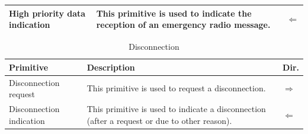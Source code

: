 \documentclass[nocc]{template/openetcs_report}
\begin{document}
\begin{longtable}{|l|l|l|}
				\hline	
													
				\begin{minipage}[t]{0.3\linewidth}High priority data indication \end{minipage}
					&\begin{minipage}[t]{0.6\linewidth} This primitive is used to indicate the reception of an emergency radio message.	\end{minipage}
					&\begin{minipage}[t]{0.1\linewidth} $\Leftarrow$ \end{minipage} \\
				
				\hline										
			\end{longtable}		
					
					
			\begin{longtable}{|l|l|l|}
				\caption{Disconnection}\\ 
				\hline
				
					\begin{minipage}[t]{0.3\linewidth} \textbf{Primitive}	\end{minipage}
				&	\begin{minipage}[t]{0.6\linewidth} \textbf{Description}	\end{minipage}
				&	\begin{minipage}[t]{0.1\linewidth} \textbf{Dir.} \end{minipage} \\
				
				\hline
				
					\begin{minipage}[t]{0.3\linewidth}Disconnection request \end{minipage}
					&\begin{minipage}[t]{0.6\linewidth} This primitive is used to request a disconnection.	\end{minipage}
					&\begin{minipage}[t]{0.1\linewidth} $\Rightarrow$ \end{minipage} \\
				
				\hline
								
					\begin{minipage}[t]{0.3\linewidth}Disconnection indication \end{minipage}
					&\begin{minipage}[t]{0.6\linewidth} This primitive is used to indicate a disconnection (after a request or due to other reason).	\end{minipage}
					&\begin{minipage}[t]{0.1\linewidth} $\Leftarrow$ \end{minipage} \\
				
				\hline									
			\end{longtable}					
						
\end{document}
